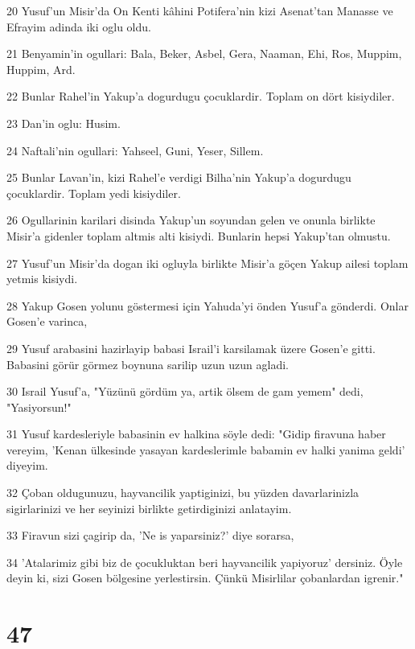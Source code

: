 \par 20 Yusuf'un Misir'da On Kenti kâhini Potifera'nin kizi Asenat'tan Manasse ve Efrayim adinda iki oglu oldu.
\par 21 Benyamin'in ogullari: Bala, Beker, Asbel, Gera, Naaman, Ehi, Ros, Muppim, Huppim, Ard.
\par 22 Bunlar Rahel'in Yakup'a dogurdugu çocuklardir. Toplam on dört kisiydiler.
\par 23 Dan'in oglu: Husim.
\par 24 Naftali'nin ogullari: Yahseel, Guni, Yeser, Sillem.
\par 25 Bunlar Lavan'in, kizi Rahel'e verdigi Bilha'nin Yakup'a dogurdugu çocuklardir. Toplam yedi kisiydiler.
\par 26 Ogullarinin karilari disinda Yakup'un soyundan gelen ve onunla birlikte Misir'a gidenler toplam altmis alti kisiydi. Bunlarin hepsi Yakup'tan olmustu.
\par 27 Yusuf'un Misir'da dogan iki ogluyla birlikte Misir'a göçen Yakup ailesi toplam yetmis kisiydi.
\par 28 Yakup Gosen yolunu göstermesi için Yahuda'yi önden Yusuf'a gönderdi. Onlar Gosen'e varinca,
\par 29 Yusuf arabasini hazirlayip babasi Israil'i karsilamak üzere Gosen'e gitti. Babasini görür görmez boynuna sarilip uzun uzun agladi.
\par 30 Israil Yusuf'a, "Yüzünü gördüm ya, artik ölsem de gam yemem" dedi, "Yasiyorsun!"
\par 31 Yusuf kardesleriyle babasinin ev halkina söyle dedi: "Gidip firavuna haber vereyim, 'Kenan ülkesinde yasayan kardeslerimle babamin ev halki yanima geldi' diyeyim.
\par 32 Çoban oldugunuzu, hayvancilik yaptiginizi, bu yüzden davarlarinizla sigirlarinizi ve her seyinizi birlikte getirdiginizi anlatayim.
\par 33 Firavun sizi çagirip da, 'Ne is yaparsiniz?' diye sorarsa,
\par 34 'Atalarimiz gibi biz de çocukluktan beri hayvancilik yapiyoruz' dersiniz. Öyle deyin ki, sizi Gosen bölgesine yerlestirsin. Çünkü Misirlilar çobanlardan igrenir."

\chapter{47}

